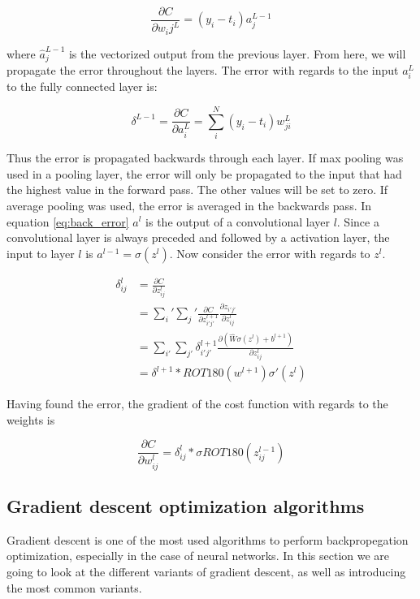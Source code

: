 \documentclass[thesis.tex]{subfiles}
\begin{document}
\begin{equation}
   \frac{\partial C}{\partial w_ij^L} = (y_i - t_i)a_j^{L-1}
\end{equation}

where $\hat{a}_{j}^{L-1}$ is the vectorized output from the previous layer. From here, we will propagate the error throughout the layers. The error with regards to the input $a_i^L$ to the fully connected layer is:

\begin{equation} %
  \delta^{L-1} = \frac{\partial C}{\partial a_i^L} = \sum_i^N (y_i - t_i)w_{ji}^{L}
  \label{eq:back_error}
\end{equation}

Thus the error is propagated backwards through each layer. If max pooling was used in a pooling layer, the error will only be propagated to the input that had the highest value in the forward pass. The other values will be set to zero. If average pooling was used, the error is averaged in the backwards pass.
In equation \ref{eq:back_error} $a^l$ is the output of a convolutional layer $l$. Since a convolutional layer is always preceded and followed by a activation layer, the input to layer $l$ is $a^{l-1} = \sigma(z^l)$. Now consider the error with regards to $z^l$.

\begin{equation}
  \begin{aligned}
  \delta_{ij}^l &= \frac{\partial C}{\partial z_{ij}^l} \\
  &= \sum_i' \sum_j' \frac{\partial C}{\partial z_{i'j'}^{l+1}}\frac{\partial z_{i'j'}}{\partial z_{ij}^l} \\
  &= \sum_{i'} \sum_{j'}\delta_{i'j'}^{l+1} \frac{\partial (\hat{W}\sigma(z^l) + b^{l+1})}{\partial z_{ij}^l} \\
  &= \delta^{l+1} * ROT180(w^{l+1})\sigma'(z^l)
  \end{aligned}
\end{equation}

Having found the error, the gradient of the cost function with regards to the weights is

\begin{equation} %
  \frac{\partial C}{\partial w_{ij}^l} = \delta_{ij}^l * \sigma{ROT180(z_{ij}^{l-1})}
\end{equation}



\subsection{Gradient descent optimization algorithms}
Gradient descent is one of the most used algorithms to perform backpropegation optimization, especially in the case of neural networks. In this section we are going to look at the different variants of gradient descent, as well as introducing the most common variants.
\end{document}
